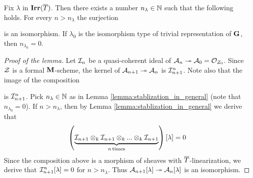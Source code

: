 \begin{lemma}\label{lemma:stabilization_for_formal_schemes}
Fix $\lambda$ in $\mathbf{Irr}(\overline{T})$. Then there exists a number $n_{\lambda}\in {\mathbb N}$ such that the following holds. For every $n > n_{\lambda}$ the surjection
\begin{center}
\end{center}
is an isomorphism. If $\lambda_0$ is the isomorphism type of trivial representation of $\mathbf{G}$, then $n_{\lambda_0} = 0$.
\end{lemma}
\begin{proof}[Proof of the lemma]
Let ${\mathcal I}_n$ be a quasi-coherent ideal of ${\mathcal A}_{n}\twoheadrightarrow {\mathcal A}_0 = {\mathcal O}_{Z_0}$.  Since ${\mathcal Z}$ is a formal $\mathbf{M}$-scheme, the kernel of ${\mathcal A}_{n+1}\twoheadrightarrow {\mathcal A}_n$ is ${\mathcal I}_{n+1}^n$. Note also that the image of the composition
\begin{center}
\end{center}
is ${\mathcal I}_{n+1}^n$. Pick $n_{\lambda}\in {\mathbb N}$ as in Lemma \ref{lemma:stablization_in_general} (note that $n_{\lambda_0}=0$). If $n>n_{\lambda}$, then by Lemma \ref{lemma:stablization_in_general} we derive that
$$\left(\underbrace{{\mathcal I}_{n+1}\otimes_{k}{\mathcal I}_{n+1}\otimes_{k}...\otimes_{k}{\mathcal I}_{n+1}}_{n\,\mathrm{times}}\right)[\lambda] = 0$$
Since the composition above is a morphism of sheaves with $\overline{T}$-linearization, we derive that ${\mathcal I}_{n+1}^n[\lambda]=0$ for $n>n_{\lambda}$. Thus ${\mathcal A}_{n+1}[\lambda]\twoheadrightarrow {\mathcal A}_n[\lambda]$ is an isomorphism.
\end{proof}

